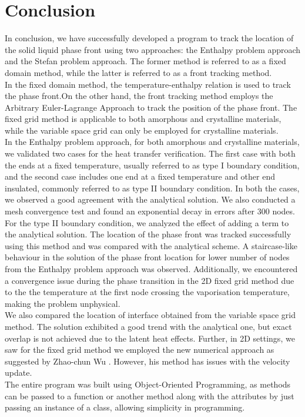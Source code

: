 \chapter{Conclusion\label{cha:chapter7}}
In conclusion, we have successfully developed a program to track the location of the solid liquid phase front using two approaches: the Enthalpy problem approach and the Stefan problem approach. The former method is referred to as a fixed domain method, while the latter is referred to as a front tracking method.\\
In the fixed domain method, the temperature-enthalpy relation is used to track the phase front.On the other hand, the front tracking method employs the Arbitrary  Euler-Lagrange Approach to track the position of the phase front. The fixed grid method is applicable to both amorphous and crystalline materials, while the variable space grid can only be employed for crystalline materials.\\
In the Enthalpy problem approach, for both amorphous and crystalline materials, we validated two cases for the heat transfer verification. The first case with both the ends at a fixed temperature, usually referred to as type I boundary condition, and the second case includes one end at a fixed temperature and other end insulated, commonly referred to as type II boundary condition. In both the cases, we observed a good agreement with the analytical solution. We also conducted a mesh convergence test and found an exponential decay in errors after 300 nodes.\\
For the type II boundary condition, we analyzed the effect of adding a term to the analytical solution. The location of the phase front was tracked successfully using this method and was compared with the analytical scheme.  A staircase-like behaviour in the solution of the phase front location for lower number of nodes from the Enthalpy problem approach was observed. Additionally, we encountered a convergence issue during the phase transition in the 2D fixed grid method due to the the temperature at the first node crossing the vaporisation temperature, making the problem unphysical. \\
We also compared the location of interface obtained from the variable space grid method. The solution exhibited a good trend with the analytical one, but exact overlap is not achieved due to the latent heat effects. Further, in 2D settings, we saw for the fixed grid method we employed the new numerical approach as suggested by Zhao-chun Wu \cite{Wu+2005+281+288}. However, his method has issues with the velocity update.\\
The entire program was built using Object-Oriented Programming, as methods can be passed to a function or another method along with the attributes by just passing an instance of a class, allowing simplicity in programming. \\

